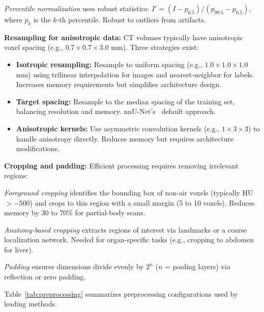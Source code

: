 \documentclass[conference]{IEEEtran}
\begin{document}
\emph{Percentile normalization} uses robust statistics: $I' = (I - p_{0.5}) / (p_{99.5} - p_{0.5})$, where $p_k$ is the $k$-th percentile. Robust to outliers from artifacts.

\textbf{Resampling for anisotropic data:} CT volumes typically have anisotropic voxel spacing (e.g., $0.7 \times 0.7 \times 3.0$ mm). Three strategies exist:

\begin{itemize}
    \item \textbf{Isotropic resampling:} Resample to uniform spacing (e.g., $1.0 \times 1.0 \times 1.0$ mm) using trilinear interpolation for images and nearest-neighbor for labels. Increases memory requirements but simplifies architecture design.
    \item \textbf{Target spacing:} Resample to the median spacing of the training set, balancing resolution and memory. nnU-Net's~\cite{isensee2021nnunet} default approach.
    \item \textbf{Anisotropic kernels:} Use asymmetric convolution kernels (e.g., $1 \times 3 \times 3$) to handle anisotropy directly. Reduces memory but requires architecture modifications.
\end{itemize}

\textbf{Cropping and padding:} Efficient processing requires removing irrelevant regions:

\emph{Foreground cropping} identifies the bounding box of non-air voxels (typically HU $> -500$) and crops to this region with a small margin (5 to 10 voxels). Reduces memory by 30 to 70\% for partial-body scans.

\emph{Anatomy-based cropping} extracts regions of interest via landmarks or a coarse localization network. Needed for organ-specific tasks (e.g., cropping to abdomen for liver).

\emph{Padding} ensures dimensions divide evenly by $2^n$ ($n$ = pooling layers) via reflection or zero padding.

Table~\ref{tab:preprocessing} summarizes preprocessing configurations used by leading methods.

\begin{table}[!htb]
\centering
\small
\caption{Preprocessing Configurations of Leading Segmentation Methods}
\label{tab:preprocessing}
\end{table}
\end{document}
